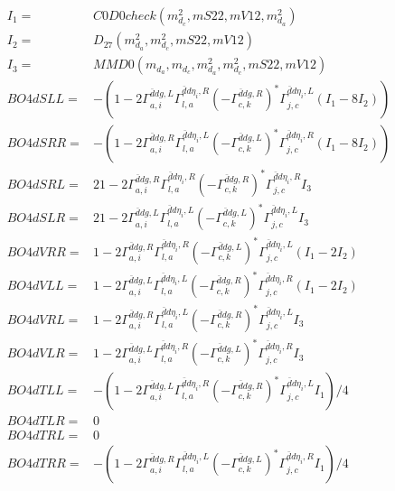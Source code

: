 \documentclass[A4,landscape]{article}
\begin{document}
\begin{align} 
I_1 = & C0D0check(m^2_{d_{{c}}}, mS22, mV12, m^2_{d_{{a}}}) \\ 
I_2 = & D_{27}(m^2_{d_{{a}}}, m^2_{d_{{c}}}, mS22, mV12) \\ 
I_3 = & MMD0(m_{d_{{a}}}, m_{d_{{c}}}, m^2_{d_{{a}}}, m^2_{d_{{c}}}, mS22, mV12) \\ 
  BO4dSLL= & -(1
-
2 \Gamma^{\bar{d}d g ,L}_{a, i} \Gamma^{\bar{d}d \eta_i ,R}_{l, a} (- \Gamma^{\bar{d}d g ,R} _{c, k})^* \Gamma^{\bar{d}d \eta_i ,L}_{j, c} (I_1 - 8 I_2)) \\ 
  BO4dSRR= & -(1
-
2 \Gamma^{\bar{d}d g ,R}_{a, i} \Gamma^{\bar{d}d \eta_i ,L}_{l, a} (- \Gamma^{\bar{d}d g ,L} _{c, k})^* \Gamma^{\bar{d}d \eta_i ,R}_{j, c} (I_1 - 8 I_2)) \\ 
  BO4dSRL= & 2 1
-
2 \Gamma^{\bar{d}d g ,R}_{a, i} \Gamma^{\bar{d}d \eta_i ,R}_{l, a} (- \Gamma^{\bar{d}d g ,R} _{c, k})^* \Gamma^{\bar{d}d \eta_i ,R}_{j, c} I_3 \\ 
  BO4dSLR= & 2 1
-
2 \Gamma^{\bar{d}d g ,L}_{a, i} \Gamma^{\bar{d}d \eta_i ,L}_{l, a} (- \Gamma^{\bar{d}d g ,L} _{c, k})^* \Gamma^{\bar{d}d \eta_i ,L}_{j, c} I_3 \\ 
  BO4dVRR= & 1
-
2 \Gamma^{\bar{d}d g ,R}_{a, i} \Gamma^{\bar{d}d \eta_i ,R}_{l, a} (- \Gamma^{\bar{d}d g ,L} _{c, k})^* \Gamma^{\bar{d}d \eta_i ,L}_{j, c} (I_1 - 2 I_2) \\ 
  BO4dVLL= & 1
-
2 \Gamma^{\bar{d}d g ,L}_{a, i} \Gamma^{\bar{d}d \eta_i ,L}_{l, a} (- \Gamma^{\bar{d}d g ,R} _{c, k})^* \Gamma^{\bar{d}d \eta_i ,R}_{j, c} (I_1 - 2 I_2) \\ 
  BO4dVRL= & 1
-
2 \Gamma^{\bar{d}d g ,R}_{a, i} \Gamma^{\bar{d}d \eta_i ,L}_{l, a} (- \Gamma^{\bar{d}d g ,R} _{c, k})^* \Gamma^{\bar{d}d \eta_i ,L}_{j, c} I_3 \\ 
  BO4dVLR= & 1
-
2 \Gamma^{\bar{d}d g ,L}_{a, i} \Gamma^{\bar{d}d \eta_i ,R}_{l, a} (- \Gamma^{\bar{d}d g ,L} _{c, k})^* \Gamma^{\bar{d}d \eta_i ,R}_{j, c} I_3 \\ 
  BO4dTLL= & -(1
-
2 \Gamma^{\bar{d}d g ,L}_{a, i} \Gamma^{\bar{d}d \eta_i ,R}_{l, a} (- \Gamma^{\bar{d}d g ,R} _{c, k})^* \Gamma^{\bar{d}d \eta_i ,L}_{j, c} I_1)/4 \\ 
  BO4dTLR= & 0 \\ 
  BO4dTRL= & 0 \\ 
  BO4dTRR= & -(1
-
2 \Gamma^{\bar{d}d g ,R}_{a, i} \Gamma^{\bar{d}d \eta_i ,L}_{l, a} (- \Gamma^{\bar{d}d g ,L} _{c, k})^* \Gamma^{\bar{d}d \eta_i ,R}_{j, c} I_1)/4 \\ 
\end{align} 
\end{document}
